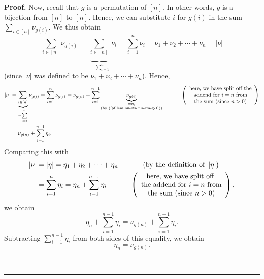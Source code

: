 \documentclass
[numbers=enddot,12pt,final,onecolumn,notitlepage,english]{scrartcl}%
\theoremstyle{definition}
\newenvironment{proof}[1][Proof]{\noindent\textbf{#1.} }{\ \rule{0.5em}{0.5em}}
\let\sumnonlimits\sum
\renewcommand{\sum}{\sumnonlimits\limits}
\newenvironment{verlong}{}{}
\begin{document}
\begin{verlong}
\begin{proof}
Now, recall that $g$ is a permutation of $\left[  n\right]  $. In other words,
$g$ is a bijection from $\left[  n\right]  $ to $\left[  n\right]  $. Hence,
we can substitute $i$ for $g\left(  i\right)  $ in the sum $\sum_{i\in\left[
n\right]  }\nu_{g\left(  i\right)  }$. We thus obtain%
\[
\sum_{i\in\left[  n\right]  }\nu_{g\left(  i\right)  }=\underbrace{\sum
_{i\in\left[  n\right]  }}_{=\sum_{i=1}^{n}}\nu_{i}=\sum_{i=1}^{n}\nu_{i}%
=\nu_{1}+\nu_{2}+\cdots+\nu_{n}=\left\vert \nu\right\vert
\]
(since $\left\vert \nu\right\vert $ was defined to be $\nu_{1}+\nu_{2}%
+\cdots+\nu_{n}$). Hence,%
\begin{align*}
\left\vert \nu\right\vert  &  =\underbrace{\sum_{i\in\left[  n\right]  }%
}_{=\sum_{i=1}^{n}}\nu_{g\left(  i\right)  }=\sum_{i=1}^{n}\nu_{g\left(
i\right)  }=\nu_{g\left(  n\right)  }+\sum_{i=1}^{n-1}\underbrace{\nu
_{g\left(  i\right)  }}_{\substack{=\eta_{i}\\\text{(by
(\ref{pf.lem.nu-eta.nu-eta-g-1}))}}}\ \ \ \ \ \ \ \ \ \ \left(
\begin{array}
[c]{c}%
\text{here, we have split off the}\\
\text{addend for }i=n\text{ from}\\
\text{the sum (since }n>0\text{)}%
\end{array}
\right) \\
&  =\nu_{g\left(  n\right)  }+\sum_{i=1}^{n-1}\eta_{i}.
\end{align*}
Comparing this with%
\begin{align*}
\left\vert \nu\right\vert  &  =\left\vert \eta\right\vert =\eta_{1}+\eta
_{2}+\cdots+\eta_{n}\ \ \ \ \ \ \ \ \ \ \left(  \text{by the definition of
}\left\vert \eta\right\vert \right) \\
&  =\sum_{i=1}^{n}\eta_{i}=\eta_{n}+\sum_{i=1}^{n-1}\eta_{i}%
\ \ \ \ \ \ \ \ \ \ \left(
\begin{array}
[c]{c}%
\text{here, we have split off }\\
\text{the addend for }i=n\text{ from}\\
\text{the sum (since }n>0\text{)}%
\end{array}
\right)  ,
\end{align*}
we obtain%
\[
\eta_{n}+\sum_{i=1}^{n-1}\eta_{i}=\nu_{g\left(  n\right)  }+\sum_{i=1}%
^{n-1}\eta_{i}.
\]
Subtracting $\sum_{i=1}^{n-1}\eta_{i}$ from both sides of this equality, we
obtain%
\begin{equation}
\eta_{n}=\nu_{g\left(  n\right)  }. \label{pf.lem.nu-eta.nu-eta-g-n}%
\end{equation}



\end{proof}
\end{verlong}
\end{document}
